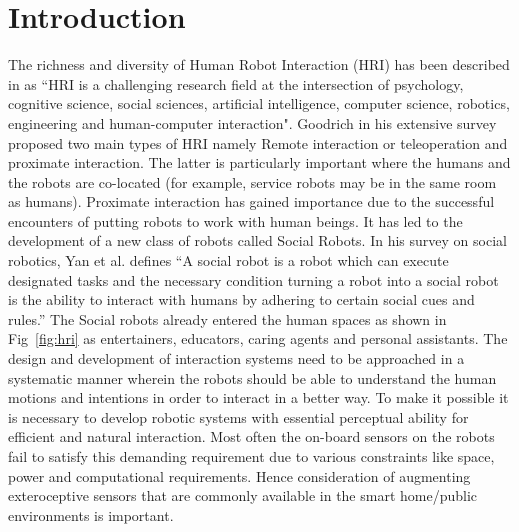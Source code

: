 \documentclass{llncs}
\begin{document}
\section{Introduction}
The richness and diversity of Human Robot Interaction (HRI) has been described in \cite{Dautenhahn2007} as ``HRI is a challenging research field at the intersection of psychology, cognitive science, social sciences, artificial intelligence, computer science, robotics, engineering and human-computer interaction". Goodrich\cite{Goodrich:2007:HIS:1348099.1348100} in his extensive survey proposed two main types of HRI namely Remote interaction or teleoperation and proximate interaction. The latter is particularly important where the humans and the robots are co-located (for example, service robots may be in the same room as humans). Proximate interaction has gained importance due to the successful encounters of putting robots to work with human beings. It has led to the development of a new class of robots called Social Robots. In his survey on social robotics, Yan et al. \cite{Yan2014} defines ``A social robot is a robot which can execute designated tasks and the necessary condition turning a robot into a social robot is the ability to interact with humans by adhering to certain social cues and rules.''
The Social robots already entered the human spaces as shown in Fig~\ref{fig:hri} as entertainers\cite{NaoTheRobot}, educators\cite{NaoTheRobot}, caring agents\cite{ASKNao} and personal assistants\cite{ProjectRomeo}\cite{PepperTheRobot}. The design and development of interaction systems need to be approached in a systematic manner wherein the robots should be able to understand the human motions and intentions in order to interact in a better way. To make it possible it is necessary to develop robotic systems with essential perceptual ability for efficient and natural interaction. Most often the on-board sensors on the robots fail to satisfy this demanding requirement due to various constraints like space, power and computational requirements. Hence consideration of augmenting exteroceptive sensors that are commonly available in the smart home/public environments is important.
\end{document}

